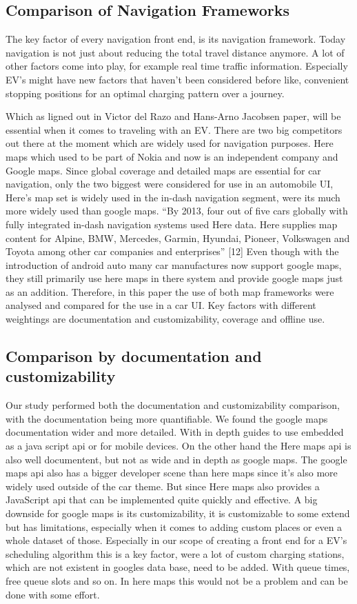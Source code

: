 \subsection{Comparison of Navigation Frameworks}

The key factor of every navigation front end, is its navigation framework. Today navigation is not just about reducing the total travel distance anymore. A lot of other factors come into play, for example real time traffic information. Especially EV’s might have new factors that haven’t been considered before like, convenient stopping positions for an optimal charging pattern over a journey.

Which as ligned out in Victor del Razo and Hans-Arno Jacobsen paper, will be essential when it comes to traveling with an EV. There are two big competitors out there at the moment which are widely used for navigation purposes. Here maps which used to be part of Nokia and now is an independent company and Google maps. Since global coverage and detailed maps are essential for car navigation, only the two biggest were considered for use in an automobile UI, Here’s map set is widely used in the in-dash navigation segment, were its much more widely used than google maps. “By 2013, four out of five cars globally with fully integrated in-dash navigation systems used Here data. Here supplies map content for Alpine, BMW, Mercedes, Garmin, Hyundai, Pioneer, Volkswagen and Toyota among other car companies and enterprises” [12] Even though with the introduction of android auto many car manufactures now support google maps, they still primarily use here maps in there system and provide google maps just as an addition. Therefore, in this paper the use of both map frameworks were analysed and compared for the use in a car UI. Key factors with different weightings are documentation and customizability, coverage and offline use.

\subsection{Comparison by documentation and customizability}

Our study performed both the documentation and customizability comparison, with the documentation being more quantifiable. We found the google maps documentation wider and more detailed. With in depth guides to use embedded as a java script api or for mobile devices. On the other hand the Here maps api is also well documentent, but not as wide and in depth as google maps. The google maps api also has a bigger developer scene than here maps since it’s also more widely used outside of the car theme. But since Here maps also provides a JavaScript api that can be implemented quite quickly and effective. A big downside for google maps is its customizability, it is customizable to some extend but has limitations, especially when it comes to adding custom places or even a whole dataset of those. Especially in our scope of creating a front end for a EV’s scheduling algorithm this is a key factor, were a lot of custom charging stations, which are not existent in googles data base, need to be added. With queue times, free queue slots and so on. In here maps this would not be a problem and can be done with some effort. 


